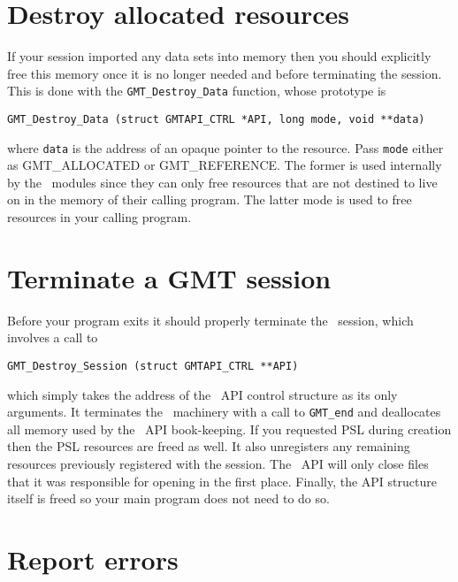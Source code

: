 \documentclass{report}
\begin{document}
\section{Destroy allocated resources}

If your session imported any data sets into memory then you should explicitly free this
memory once it is no longer needed and before terminating the session.
This is done with the \texttt{GMT\_Destroy\_Data} function, whose prototype is

\begin{verbatim}
GMT_Destroy_Data (struct GMTAPI_CTRL *API, long mode, void **data)
\end{verbatim}
where \texttt{data} is the address of an opaque pointer to the resource.
Pass \texttt{mode} either as GMT\_ALLOCATED or GMT\_REFERENCE.  The former
is used internally by the \GMT\ modules since they can only free resources that are
not destined to live on in the memory of their calling program.  The latter mode is used
to free resources in your calling program.

\section{Terminate a GMT session}

Before your program exits it should properly terminate the \GMT\ session, which involves a call to

\begin{verbatim}
GMT_Destroy_Session (struct GMTAPI_CTRL **API)
\end{verbatim}
which simply takes the address of the \GMT\ API control structure as its only arguments.  It terminates the \GMT\ machinery
with a call to \texttt{GMT\_end} and deallocates all memory used by the \GMT\ API book-keeping. If you
requested PSL during creation then the PSL resources are freed as well.  It
also unregisters any remaining resources previously registered with the session.
The \GMT\ API will only close files that it was responsible for opening in the first place.
Finally, the API structure itself is freed so your main program does not need to do so.

\section{Report errors}
\end{document}
